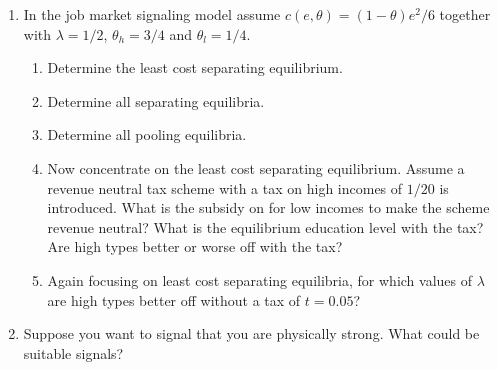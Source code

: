 \documentclass[a4paper,12pt]{article}
\begin{document}
\begin{enumerate}[resume]
\item In the job market signaling model assume $c(e,\theta )=(1-\theta) e^2/6$ together with $\lambda=1/2$, $\theta _h=3/4$ and $\theta _l=1/4$.
  \begin{enumerate}
  \item Determine the least cost separating equilibrium.
  \item Determine all separating equilibria.
  \item Determine all pooling equilibria.
  \item Now concentrate on the least cost separating equilibrium. Assume a revenue neutral tax scheme with a tax on high incomes of $1/20$ is introduced. What is the subsidy on for low incomes to make the scheme revenue neutral? What is the equilibrium education level with the tax? Are high types better or worse off with the tax?
  \item Again focusing on least cost separating equilibria, for which values of $\lambda$ are high types better off without a tax of $t=0.05$?
  \end{enumerate}
\item Suppose you want to signal that you are physically strong. What could be suitable signals?
\end{enumerate}

\newpage


\end{document}
